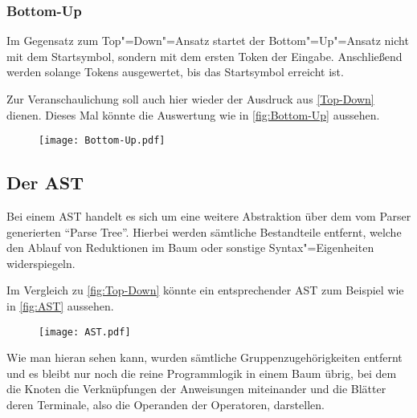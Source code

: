             \subsubsection{Bottom-Up}\label{Bottom-Up}
                Im Gegensatz zum Top"=Down"=Ansatz startet der Bottom"=Up"=Ansatz nicht mit dem Startsymbol,
                sondern mit dem ersten Token der Eingabe.
                Anschließend werden solange Tokens ausgewertet,
                bis das Startsymbol erreicht ist.

                Zur Veranschaulichung soll auch hier wieder der Ausdruck aus
                \vref{Top-Down} dienen.
                Dieses Mal könnte die Auswertung
                wie in
                \vref{fig:Bottom-Up} aussehen.

                \begin{figure}[htp]
                    \centering%
                    \texttt{[image: Bottom-Up.pdf]}
                    \label{fig:Bottom-Up}
                \end{figure}

        \subsection{Der AST}\label{Der AST}
            Bei einem
            \gls{AST} handelt es sich um eine weitere Abstraktion über dem vom Parser generierten
            \foreignquote{english}{Parse Tree}.
            Hierbei werden sämtliche Bestandteile entfernt,
            welche den Ablauf von Reduktionen im Baum oder
            sonstige Syntax"=Eigenheiten widerspiegeln.\cite[26]{Watson2017}

            Im Vergleich zu
            \vref{fig:Top-Down} könnte ein entsprechender
            \gls{AST} zum Beispiel
            wie in
            \vref{fig:AST} aussehen.

            \begin{figure}[htp]
                \centering%
                \texttt{[image: AST.pdf]}
                \label{fig:AST}
            \end{figure}

            Wie man hieran sehen kann,
            wurden sämtliche Gruppenzugehörigkeiten entfernt und
            es bleibt nur noch die reine Programmlogik in einem Baum übrig,
            bei dem die Knoten die Verknüpfungen der Anweisungen miteinander und
            die Blätter deren Terminale,
            also die Operanden der Operatoren,
            darstellen.

